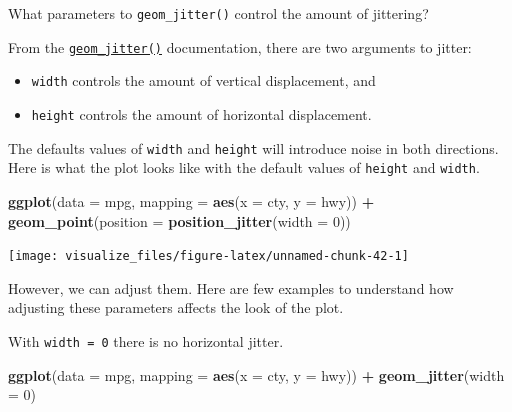 \documentclass[]{book}
\newenvironment{Shaded}{\begin{snugshade}}{\end{snugshade}}
\newcommand{\DataTypeTok}[1]{\textcolor[rgb]{0.13,0.29,0.53}{#1}}
\newcommand{\DecValTok}[1]{\textcolor[rgb]{0.00,0.00,0.81}{#1}}
\newcommand{\KeywordTok}[1]{\textcolor[rgb]{0.13,0.29,0.53}{\textbf{#1}}}
\newcommand{\NormalTok}[1]{#1}
\newcommand{\OperatorTok}[1]{\textcolor[rgb]{0.81,0.36,0.00}{\textbf{#1}}}
\newcommand{\StringTok}[1]{\textcolor[rgb]{0.31,0.60,0.02}{#1}}
\providecommand{\tightlist}{%
  \setlength{\itemsep}{0pt}\setlength{\parskip}{0pt}}
\theoremstyle{plain}
\theoremstyle{remark}
\begin{document}
What parameters to \texttt{geom\_jitter()} control the amount of jittering?

From the \href{https://ggplot2.tidyverse.org/reference/geom_jitter.html}{\texttt{geom\_jitter()}} documentation, there are two arguments to jitter:

\begin{itemize}
\tightlist
\item
  \texttt{width} controls the amount of vertical displacement, and
\item
  \texttt{height} controls the amount of horizontal displacement.
\end{itemize}

The defaults values of \texttt{width} and \texttt{height} will introduce noise in both directions.
Here is what the plot looks like with the default values of \texttt{height} and \texttt{width}.

\begin{Shaded}
\begin{Highlighting}[]
\KeywordTok{ggplot}\NormalTok{(}\DataTypeTok{data =}\NormalTok{ mpg, }\DataTypeTok{mapping =} \KeywordTok{aes}\NormalTok{(}\DataTypeTok{x =}\NormalTok{ cty, }\DataTypeTok{y =}\NormalTok{ hwy)) }\OperatorTok{+}
\StringTok{  }\KeywordTok{geom_point}\NormalTok{(}\DataTypeTok{position =} \KeywordTok{position_jitter}\NormalTok{(}\DataTypeTok{width =} \DecValTok{0}\NormalTok{))}
\end{Highlighting}
\end{Shaded}

\begin{center}\texttt{[image: visualize\_files/figure-latex/unnamed-chunk-42-1]} \end{center}

However, we can adjust them. Here are few examples to understand how adjusting
these parameters affects the look of the plot.

With \texttt{width\ =\ 0} there is no horizontal jitter.

\begin{Shaded}
\begin{Highlighting}[]
\KeywordTok{ggplot}\NormalTok{(}\DataTypeTok{data =}\NormalTok{ mpg, }\DataTypeTok{mapping =} \KeywordTok{aes}\NormalTok{(}\DataTypeTok{x =}\NormalTok{ cty, }\DataTypeTok{y =}\NormalTok{ hwy)) }\OperatorTok{+}
\StringTok{  }\KeywordTok{geom_jitter}\NormalTok{(}\DataTypeTok{width =} \DecValTok{0}\NormalTok{)}
\end{Highlighting}
\end{Shaded}
\end{document}
